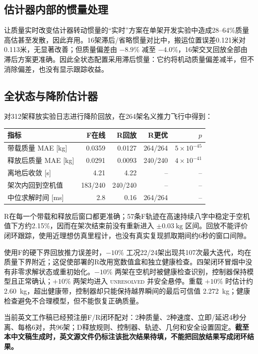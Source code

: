 \documentclass[11pt,UTF8,fontset=none]{ctexrep}
\begin{document}
\subsection{估计器内部的惯量处理}

让质量实时改变估计器转动惯量的“实时”方案在单架开发实验中造成28--64\%质量高估甚至发散，因此弃用。16架滞后/省略惯量对比中，搬运位置误差0.121米对0.113米，无显著改善；但质量偏差由 $-8.9\%$ 减至 $-4.0\%$，16架交叉回放全部由滞后方案更准确。因此全状态配置采用滞后惯量：它约将机动质量偏差减半，但不消除偏差，也没有显示跟踪收益。

\subsection{全状态与降阶估计器}

对312架释放实验日志进行降阶回放，在264架名义推力飞行中得到：
\begin{center}\small
\begin{tabular}{lrrrr}
\toprule
指标 & F在线 & R回放 & R更优 & $p$\\
\midrule
带载质量 MAE [kg] & 0.0359 & 0.0127 & 264/264 & $5\times10^{-45}$\\
释放后质量 MAE [kg] & 0.0291 & 0.0093 & 240/240 & $4\times10^{-41}$\\
离地后收敛 [s] & 4.21 & 4.22 & -- & --\\
架次内回到空机值 & 183/240 & 240/240 & -- & --\\
中位求解时间 [ms] & 2.8 & 0.16 & 264/264 & --\\
\bottomrule
\end{tabular}
\end{center}
R在每一个带载和释放后窗口都更准确；57条F轨迹在高速持续八字中稳定于空机值下方约2.15\%，因而在架次结束前没有重新进入 $\pm\SI{0.03}{\kg}$ 区间。回放不能评价闭环跟踪，使用近理想仿真里程计，也没有真实复现抓取期间约6秒的窗口间隙。

使用F的硬下界回放推力误差时，$-10\%$ 工况22/24架出现共107次最大迭代，均在质量下界附近；这促使部署的R改用宽数值盒和独立健康检查。四架闭环冒烟中没有非零求解状态或重初始化。$-10\%$ 两架在空机时被健康检查识别，控制器保持模型且正常确认；$+10\%$ 两架均进入 \textsc{unresolved} 并安全悬停。重载 $+10\%$ 时估计约 \SI{2.60}{\kg}，超出健康带，控制器却只能保持越界瞬间的最后可信值 \SI{2.272}{\kg}；健康检查避免不合理模型，但不能恢复正确质量。

当前英文工作稿已经预注册F/R闭环配对：2种质量、2种速度、立即/延迟4秒分离、每格6对，共96架；D释放规则、控制器、轨迹、几何和安全设置固定。\textbf{截至本中文稿生成时，英文源文件仍标注该批次结果待填，不能把回放结果写成闭环结果。}
\end{document}
